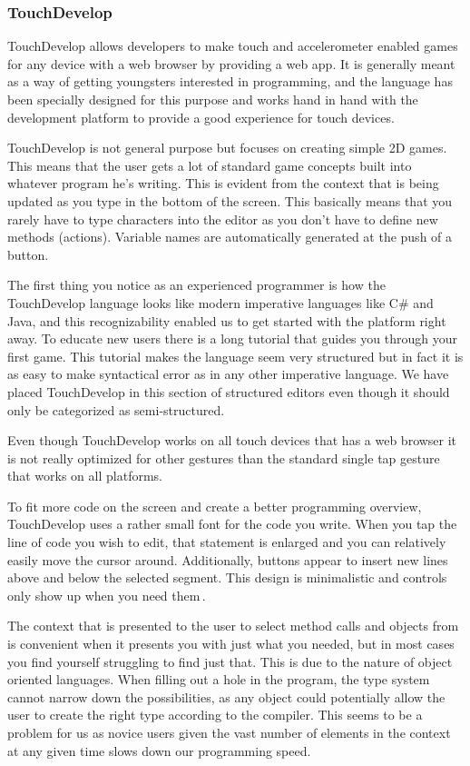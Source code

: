\subsubsection{TouchDevelop}
\label{subsub:TouchDevelop}
TouchDevelop allows developers to make touch and accelerometer enabled games for any device with a web browser by providing a web app. It is generally meant as a way of getting youngsters interested in programming, and the language has been specially designed for this purpose and works hand in hand with the development platform to provide a good experience for touch devices.

TouchDevelop is not general purpose but focuses on creating simple 2D games. This means that the user gets a lot of standard game concepts built into whatever program he's writing. This is evident from the context that is being updated as you type in the bottom of the screen. This basically means that you rarely have to type characters into the editor as you don't have to define new methods (actions). Variable names are automatically generated at the push of a button.

The first thing you notice as an experienced programmer is how the TouchDevelop language looks like modern imperative languages like C\# and Java, and this recognizability enabled us to get started with the platform right away. To educate new users there is a long tutorial that guides you through your first game. This tutorial makes the language seem very structured but in fact it is as easy to make syntactical error as in any other imperative language. We have placed TouchDevelop in this section of structured editors even though it should only be categorized as semi-structured.

Even though TouchDevelop works on all touch devices that has a web browser it is not really optimized for other gestures than the standard single tap gesture that works on all platforms.

To fit more code on the screen and create a better programming overview, TouchDevelop uses a rather small font for the code you write. When you tap the line of code you wish to edit, that statement is enlarged and you can relatively easily move the cursor around. Additionally, buttons appear to insert new lines above and below the selected segment. This design is minimalistic and controls only show up when you need them\,\cite{nielsen1990heuristic}.

The context that is presented to the user to select method calls and objects from is convenient when it presents you with just what you needed, but in most cases you find yourself struggling to find just that. This is due to the nature of object oriented languages. When filling out a hole in the program, the type system cannot narrow down the possibilities, as any object could potentially allow the user to create the right type according to the compiler. This seems to be a problem for us as novice users given the vast number of elements in the context at any given time slows down our programming speed.

